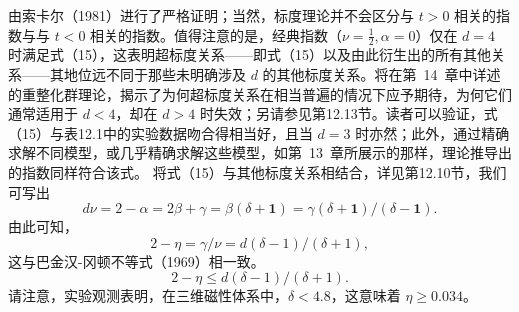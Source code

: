 由索卡尔（1981）进行了严格证明；当然，标度理论并不会区分与 \(t>0\) 相关的指数与与 \(t<0\) 相关的指数。值得注意的是，经典指数（\(\nu=\frac{1}{2},\alpha=0\)）仅在 \(d=4\) 时满足式（15），这表明超标度关系——即式（15）以及由此衍生出的所有其他关系——其地位远不同于那些未明确涉及 \(d\) 的其他标度关系。将在第~14~章中详述的重整化群理论，揭示了为何超标度关系在相当普遍的情况下应予期待，为何它们通常适用于 \(d<4\)，却在 \(d>4\) 时失效；另请参见第12.13节。读者可以验证，式（15）与表12.1中的实验数据吻合得相当好，且当 \(d=3\) 时亦然；此外，通过精确求解不同模型，或几乎精确求解这些模型，如第~13~章所展示的那样，理论推导出的指数同样符合该式。
将式（15）与其他标度关系相结合，详见第12.10节，我们可写出
\begin{equation}\tag{12.12.18}\label{eq:12.12.18}
d \nu = 2 - \alpha = 2 \beta + \gamma = \beta ( \delta + \mathbf { 1 } ) = \gamma ( \delta + \mathbf { 1 } ) / ( \delta - \mathbf { 1 } ) .
\end{equation}
由此可知，
\begin{equation}\tag{12.12.19}\label{eq:12.12.19}
2 - \eta = \gamma / \nu = d ( \delta - 1 ) / ( \delta + 1 ) ,
\end{equation}
这与巴金汉-冈顿不等式（1969）相一致。
\begin{equation}\tag{12.12.20}\label{eq:12.12.20}
2 - \eta \leq d ( \delta - 1 ) / ( \delta + 1 ) .
\end{equation}
请注意，实验观测表明，在三维磁性体系中，\(\delta < 4.8\)，这意味着 \(\eta \geq 0.034\)。
